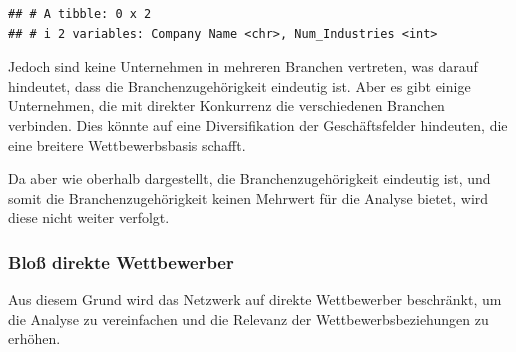 \documentclass[
]{article}
\begin{document}
\begin{verbatim}
## # A tibble: 0 x 2
## # i 2 variables: Company Name <chr>, Num_Industries <int>
\end{verbatim}

Jedoch sind keine Unternehmen in mehreren Branchen vertreten, was darauf
hindeutet, dass die Branchenzugehörigkeit eindeutig ist. Aber es gibt
einige Unternehmen, die mit direkter Konkurrenz die verschiedenen
Branchen verbinden. Dies könnte auf eine Diversifikation der
Geschäftsfelder hindeuten, die eine breitere Wettbewerbsbasis schafft.

Da aber wie oberhalb dargestellt, die Branchenzugehörigkeit eindeutig
ist, und somit die Branchenzugehörigkeit keinen Mehrwert für die Analyse
bietet, wird diese nicht weiter verfolgt.

\subsubsection{Bloß direkte
Wettbewerber}\label{blouxdf-direkte-wettbewerber}

Aus diesem Grund wird das Netzwerk auf direkte Wettbewerber beschränkt,
um die Analyse zu vereinfachen und die Relevanz der
Wettbewerbsbeziehungen zu erhöhen.
\end{document}

